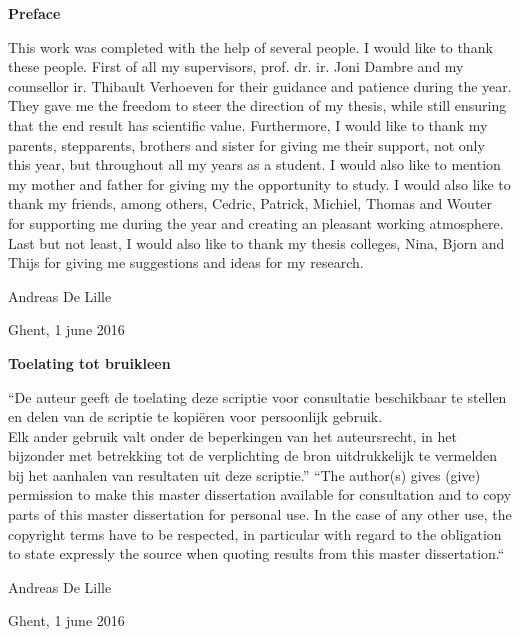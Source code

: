 
\newpage

\noindent \textbf{\huge Preface}

\vspace{1.5cm}

\noindent

This work was completed with the help of several people. I would like to thank these people. First of all my supervisors, prof. dr. ir. Joni Dambre and my counsellor ir. Thibault Verhoeven for their guidance and patience during the year. They gave me the freedom to steer the direction of my thesis, while still ensuring that the end result has scientific value.
\npar
Furthermore, I would like to thank my parents, stepparents, brothers and sister for giving me their support, not only this year, but throughout all my years as a student. I would also like to mention my mother and father for giving my the opportunity to study.
\npar
I would also like to thank my friends, among others, Cedric, Patrick, Michiel, Thomas and Wouter for supporting me during the year and creating an pleasant working atmosphere. 
\npar
Last but not least, I would also like to thank my thesis colleges, Nina, Bjorn and Thijs for giving me suggestions and ideas for my research.

\addvspace{3cm}

\hfill \noindent Andreas De Lille

\hfill \noindent Ghent, 1 june 2016


\addvspace{9cm}

\doclicenseThis

\clearpage

\noindent \textbf{\huge Toelating tot bruikleen}

\vspace{1.5cm}

\noindent
``De auteur geeft de toelating deze scriptie voor consultatie beschikbaar
te stellen en delen van de scriptie te kopi\"eren voor persoonlijk
gebruik.\\
Elk ander gebruik valt onder de beperkingen van het auteursrecht,
in het bijzonder met betrekking tot de verplichting de bron uitdrukkelijk
te vermelden bij het aanhalen van resultaten uit deze scriptie.''
\npar
``The author(s) gives (give) permission to make this master dissertation available for consultation
and to copy parts of this master dissertation for personal use.
 In the case of any other use, the copyright terms have to be respected, in particular with regard to
the obligation to state expressly the source when quoting results from this master dissertation.``

\addvspace{4cm}

\hfill \noindent Andreas De Lille

\hfill \noindent Ghent, 1 june 2016